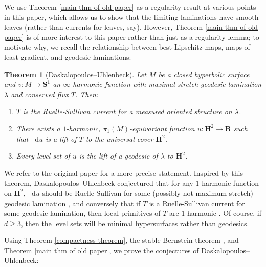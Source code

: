 \documentclass[reqno,11pt]{amsart}
\newcommand{\RR}{\mathbf{R}}
\newcommand{\Hyp}{\mathbf H}
\newcommand{\Sph}{\mathbf S}
\newcommand*\dif{\mathop{}\!\mathrm{d}}
\newtheorem{theorem}{Theorem}[section]
\theoremstyle{definition}
\numberwithin{equation}{section}
\begin{document}
We use Theorem \ref{main thm of old paper} as a regularity result at various points in this paper, which allows us to show that the limiting laminations have smooth leaves (rather than currents for leaves, say).
However, Theorem \ref{main thm of old paper} is of more interest to this paper rather than just as a regularity lemma; to motivate why, we recall the relationship between best Lipschitz maps, maps of least gradient, and geodesic laminations:

\begin{theorem}[Daskalopoulos--Uhlenbeck]\label{DU theorem}
Let $M$ be a closed hyperbolic surface and $v: M \to \Sph^1$ an $\infty$-harmonic function with maximal stretch geodesic lamination $\lambda$ and conserved flux $T$. Then:
\begin{enumerate}
\item $T$ is the Ruelle-Sullivan current for a measured oriented structure on $\lambda$.
\item There exists a $1$-harmonic, $\pi_1(M)$-equivariant function $u: \Hyp^2 \to \RR$ such that $\dif u$ is a lift of $T$ to the universal cover $\Hyp^2$.
\item Every level set of $u$ is the lift of a geodesic of $\lambda$ to $\Hyp^2$.
\end{enumerate}
\end{theorem}

We refer to the original paper \cite{daskalopoulos2020transverse} for a more precise statement.
Inspired by this theorem, Daskalopoulos--Uhlenbeck conjectured that for any $1$-harmonic function on $\Hyp^2$, $\dif u$ should be Ruelle-Sullivan for some (possibly not maximum-stretch) geodesic lamination \cite[Problem 9.4]{daskalopoulos2020transverse}, and conversely that if $T$ is a Ruelle-Sullivan current for some geodesic lamination, then local primitives of $T$ are $1$-harmonic \cite[Conjecture 9.5]{daskalopoulos2020transverse}.
Of course, if $d \geq 3$, then the level sets will be minimal hypersurfaces rather than geodesics.

Using Theorem \ref{compactness theorem}, the stable Bernstein theorem \cite{Schoen2016, Chodosh2021}, and Theorem \ref{main thm of old paper}, we prove the conjectures of Daskalopoulos--Uhlenbeck:
\end{document}
